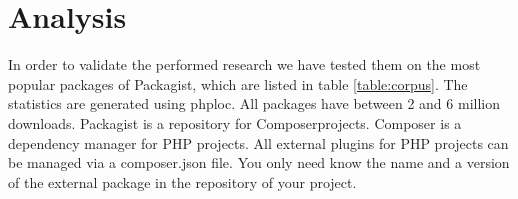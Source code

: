 \documentclass[../main.tex]{subfiles}
\begin{document}
    \chapter{Analysis}\label{chap:analysis}

       

In order to validate the performed research we have tested them on the most popular packages of Packagist\footnotemark, which are listed in table \ref{table:corpus}.
The statistics are generated using phploc\footnotemark.
All packages have between 2 and 6 million downloads.
Packagist is a repository for Composer\footnotemark projects.
Composer is a dependency manager for PHP projects.
All external plugins for PHP projects can be managed via a composer.json file.
You only need know the name and a version of the external package in the repository of your project.
\npaddmissingzero
\npfourdigitsep
\end{document}
